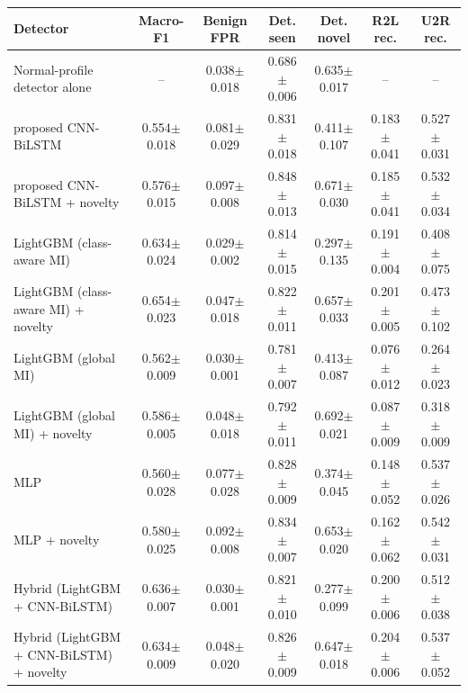 \begin{tabular}{lcccccc}
\toprule
Detector & Macro-F1 & Benign FPR & Det. seen & Det. novel & R2L rec. & U2R rec. \\
\midrule
Normal-profile detector alone & -- & 0.038$\pm$0.018 & 0.686$\pm$0.006 & 0.635$\pm$0.017 & -- & -- \\
proposed CNN-BiLSTM & 0.554$\pm$0.018 & 0.081$\pm$0.029 & 0.831$\pm$0.018 & 0.411$\pm$0.107 & 0.183$\pm$0.041 & 0.527$\pm$0.031 \\
proposed CNN-BiLSTM + novelty & 0.576$\pm$0.015 & 0.097$\pm$0.008 & 0.848$\pm$0.013 & 0.671$\pm$0.030 & 0.185$\pm$0.041 & 0.532$\pm$0.034 \\
LightGBM (class-aware MI) & 0.634$\pm$0.024 & 0.029$\pm$0.002 & 0.814$\pm$0.015 & 0.297$\pm$0.135 & 0.191$\pm$0.004 & 0.408$\pm$0.075 \\
LightGBM (class-aware MI) + novelty & 0.654$\pm$0.023 & 0.047$\pm$0.018 & 0.822$\pm$0.011 & 0.657$\pm$0.033 & 0.201$\pm$0.005 & 0.473$\pm$0.102 \\
LightGBM (global MI) & 0.562$\pm$0.009 & 0.030$\pm$0.001 & 0.781$\pm$0.007 & 0.413$\pm$0.087 & 0.076$\pm$0.012 & 0.264$\pm$0.023 \\
LightGBM (global MI) + novelty & 0.586$\pm$0.005 & 0.048$\pm$0.018 & 0.792$\pm$0.011 & 0.692$\pm$0.021 & 0.087$\pm$0.009 & 0.318$\pm$0.009 \\
MLP & 0.560$\pm$0.028 & 0.077$\pm$0.028 & 0.828$\pm$0.009 & 0.374$\pm$0.045 & 0.148$\pm$0.052 & 0.537$\pm$0.026 \\
MLP + novelty & 0.580$\pm$0.025 & 0.092$\pm$0.008 & 0.834$\pm$0.007 & 0.653$\pm$0.020 & 0.162$\pm$0.062 & 0.542$\pm$0.031 \\
Hybrid (LightGBM + CNN-BiLSTM) & 0.636$\pm$0.007 & 0.030$\pm$0.001 & 0.821$\pm$0.010 & 0.277$\pm$0.099 & 0.200$\pm$0.006 & 0.512$\pm$0.038 \\
Hybrid (LightGBM + CNN-BiLSTM) + novelty & 0.634$\pm$0.009 & 0.048$\pm$0.020 & 0.826$\pm$0.009 & 0.647$\pm$0.018 & 0.204$\pm$0.006 & 0.537$\pm$0.052 \\
\bottomrule
\end{tabular}

